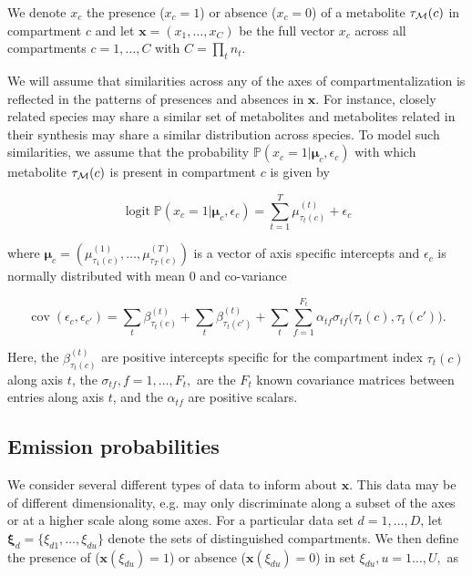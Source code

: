\documentclass[
11pt, %
oneside, %
english, %
singlespacing, %
headsepline, %
chapterinoneline, %
]{MastersDoctoralThesis} %
\DeclareMathOperator{\logit}{logit}
\DeclareMathOperator{\cov}{cov}
\def\P{\mathbb{P}}
\def\x{\boldsymbol{x}}
\def\bmu{\boldsymbol{\mu}}
\def\bxi{\boldsymbol{\xi}}
\def\M{{\cal M}}
\begin{document}
We denote $x_{c}$ the presence ($x_c=1$) or absence ($x_c=0$) of a metabolite $\tau_\M(c)$ in compartment $c$ and let $\x=(x_1, \ldots, x_C)$ be the full vector $x_c$ across all compartments $c=1, \ldots, C$ with $C=\prod_t n_t$.

We will assume that similarities across any of the axes of compartmentalization is reflected in the patterns of presences and absences in $\x$. For instance, closely related species may share a similar set of metabolites and  metabolites related in their synthesis may share a similar distribution across species. To model such similarities, we assume that the probability $\P(x_c=1|\bmu_c, \epsilon_c)$ with which metabolite $\tau_\M(c)$ is present in compartment $c$ is given by

\begin{equation}\label{eq:logit of X}
	\logit \P(x_c=1|\bmu_c, \epsilon_c) = \sum_{t=1}^{T} \mu^{(t)}_{\tau_t(c)} + \epsilon_{c}
\end{equation}

where $\bmu_c=(\mu^{(1)}_{\tau_1(c)}, \ldots, \mu^{(T)}_{\tau_T(c)})$ is a vector of axis specific intercepts and $\epsilon_{c}$ is normally distributed with mean 0 and co-variance

\begin{equation}
	\cov(\epsilon_c, \epsilon_{c'}) = \sum_t \beta^{(t)}_{\tau_t(c)} + \sum_t \beta^{(t)}_{\tau_t(c')} + \sum_t \sum_{f=1}^{F_t} \alpha_{tf} \sigma_{tf}\Big(\tau_t(c), \tau_t(c')\Big).
\end{equation}

Here, the $\beta^{(t)}_{\tau_t(c)}$ are positive intercepts specific for the compartment index $\tau_t(c)$ along axis $t$, the $\sigma_{tf}, f=1, \ldots, F_t,$ are the $F_t$ known covariance matrices between entries along axis $t$, and the $\alpha_{tf}$ are positive scalars.
	
	\subsection{Emission probabilities}\label{subsec:emission probabilities}
	
	We consider several different types of data to inform about $\x$. This data may be of different dimensionality, e.g. may only discriminate along a subset of the axes or at a higher scale along some axes. For a particular data set $d=1, \ldots, D$, let $\bxi_d=\{\xi_{d1}, \ldots, \xi_{du}\}$ denote the sets of distinguished compartments. We then define the presence of ($\x(\xi_{du})=1$) or absence ($\x(\xi_{du})=0$) in set $\xi_{du}, u=1\ldots,U,$ as
	
\end{document}
